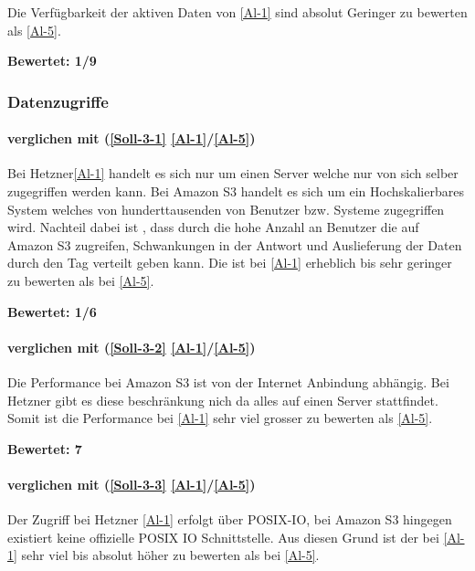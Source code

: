Die  Verfügbarkeit der aktiven Daten von \ref{Al-1} sind absolut Geringer zu bewerten als \ref{Al-5}.

\textbf{Bewertet: 1/9}

\subsubsection{Datenzugriffe}

\paragraph*{  verglichen mit  (\ref{Soll-3-1} \ref{Al-1}/\ref{Al-5})}
Bei Hetzner\ref{Al-1} handelt es sich nur um einen Server welche nur von sich selber zugegriffen werden kann. Bei Amazon S3 handelt es sich um ein Hochskalierbares System welches von hunderttausenden von Benutzer bzw. Systeme zugegriffen wird. Nachteil dabei ist , dass durch die hohe Anzahl an Benutzer die auf Amazon S3 zugreifen, Schwankungen in der Antwort und Auslieferung der Daten durch den Tag verteilt geben kann.
Die  ist bei \ref{Al-1} erheblich bis sehr geringer zu bewerten als bei \ref{Al-5}.

\textbf{Bewertet: 1/6}

\paragraph*{  verglichen mit  (\ref{Soll-3-2} \ref{Al-1}/\ref{Al-5})}
Die Performance bei Amazon S3 ist von der Internet Anbindung abhängig. Bei Hetzner gibt es diese beschränkung nich da alles auf einen Server stattfindet. Somit ist die Performance bei  \ref{Al-1} sehr viel grosser zu bewerten als  \ref{Al-5}.

\textbf{Bewertet: 7} 

\paragraph*{  verglichen mit  (\ref{Soll-3-3} \ref{Al-1}/\ref{Al-5})}
Der Zugriff bei Hetzner \ref{Al-1} erfolgt über POSIX-IO, bei Amazon S3 hingegen existiert keine offizielle POSIX IO Schnittstelle. Aus diesen Grund ist der  bei  \ref{Al-1} sehr viel bis absolut höher zu bewerten als bei  \ref{Al-5}.

